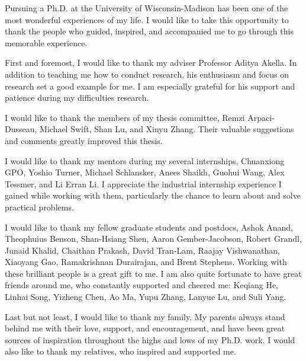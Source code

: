 \begin{acknowledgments}

Pursuing a Ph.D. at the University of Wisconsin-Madison has been one of the most wonderful experiences of my life. I would like to take this opportunity to thank the people who guided, inspired, and accompanied me to go through this memorable experience.
 
First and foremost, I would like to thank my adviser Professor Aditya Akella. In addition to teaching me how to conduct research, his enthusiasm and focus on research set a good example for me. I am especially grateful for his support and patience during my difficulties research.
 
I would like to thank the members of my thesis committee, Remzi Arpaci-Dusseau, Michael Swift, Shan Lu, and Xinyu Zhang. Their valuable suggestions and comments greatly improved this thesis.
 
I would like to thank my mentors during my several internships, Chuanxiong GPO, Yoshio Turner, Michael Schlansker, Anees Shaikh, Guohui Wang, Alex Tessmer, and Li Erran Li. I appreciate the industrial internship 
experience I gained while working with them, particularly the chance to learn about and solve practical problems.
 
I would like to thank my fellow graduate students and postdocs, Ashok Anand, Theophuius Benson, Shan-Hsiang Shen, Aaron Gember-Jacobson, Robert Grandl, Junaid Khalid, Chaithan Prakash, David Tran-Lam, Raajay Vishwanathan, Xiaoyang Gao, Ramakrishnan Durairajan, and Brent Stephens. Working with these brilliant people is a great gift to me. I am also quite fortunate to have great friends around me, who constantly supported and cheered me: Keqiang He, Linhai Song, Yizheng Chen, Ao Ma, Yupu Zhang, Lanyue Lu, and Suli Yang.
 
Last but not least, I would like to thank my family. My parents always stand behind me with their love, support, and encouragement, and have been great sources of inspiration throughout the highs and lows of my Ph.D. work. I would also like to thank my relatives, who inspired and supported me.

\end{acknowledgments}

\tableofcontents
\listoftables
\listoffigures

